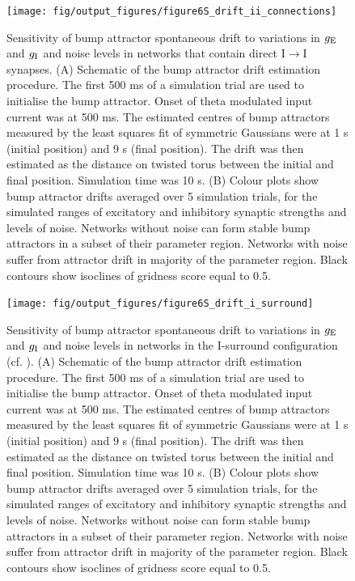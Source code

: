 \documentclass[a4paper,12pt]{article}
\newcommand{\ssc}[3]{\ensuremath{#1_{\text{#2}_{\text{#3}}}}}
\newcommand{\gE      }{\ssc{g}      {\scriptsize{E}}{}}
\newcommand{\gI      }{\ssc{g}      {\scriptsize{I}}{}}
\begin{document}
\clearpage

\begin{figure}[ht!]
    \internallinenumbers
    \centering
        \texttt{[image: fig/output\_figures/figure6S\_drift\_ii\_connections]}
    \caption{Sensitivity of bump attractor spontaneous drift to variations in
    $\gE$ and $\gI$ and noise levels in networks that contain direct
    I$\rightarrow$I synapses. (A) Schematic of the bump attractor drift
    estimation procedure. The first 500 ms of a simulation trial are used to
    initialise the bump attractor. Onset of theta modulated input current was
    at 500 ms.  The estimated centres of bump attractors measured by the least
    squares fit of symmetric Gaussians were at 1 s (initial position) and 9 s
    (final position). The drift was then estimated as the distance on twisted
    torus between the initial and final position. Simulation time was 10 s. (B)
    Colour plots show bump attractor drifts averaged over 5 simulation trials,
    for the simulated ranges of excitatory and inhibitory synaptic strengths
    and levels of noise.  Networks without noise can form stable bump
    attractors in a subset of their parameter region. Networks with noise
    suffer from attractor drift in majority of the parameter region. Black
    contours show isoclines of gridness score equal to 0.5.}
\end{figure}

\clearpage

\begin{figure}[ht!]
    \internallinenumbers
    \centering
        \texttt{[image: fig/output\_figures/figure6S\_drift\_i\_surround]}
    \caption{Sensitivity of bump attractor spontaneous drift to variations in
    $\gE$ and $\gI$ and noise levels in networks in the I-surround
    configuration (cf. \cite{Pastoll:2013ff}). (A) Schematic of the bump
    attractor drift estimation procedure. The first 500 ms of a simulation
    trial are used to initialise the bump attractor. Onset of theta modulated
    input current was at 500 ms.  The estimated centres of bump attractors
    measured by the least squares fit of symmetric Gaussians were at 1 s
    (initial position) and 9 s (final position). The drift was then estimated
    as the distance on twisted torus between the initial and final position.
    Simulation time was 10 s. (B) Colour plots show bump attractor drifts
    averaged over 5 simulation trials, for the simulated ranges of excitatory
    and inhibitory synaptic strengths and levels of noise.  Networks without
    noise can form stable bump attractors in a subset of their parameter
    region. Networks with noise suffer from attractor drift in majority of the
    parameter region. Black contours show isoclines of gridness score equal to
    0.5.}
\end{figure}
\end{document}
